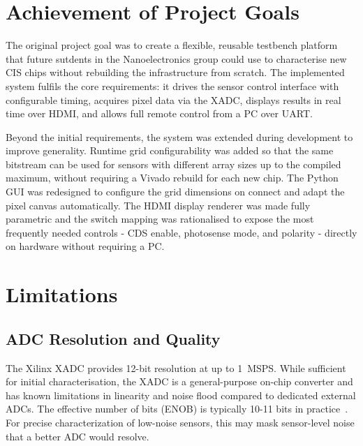 
\section{Achievement of Project Goals}

The original project goal was to create a flexible, reusable testbench platform that future sutdents in the Nanoelectronics group could use to characterise new CIS chips without rebuilding the infrastructure from scratch. The implemented system fulfils the core requirements: it drives the sensor control interface with configurable timing, acquires pixel data via the XADC, displays results in  real time over HDMI, and allows full remote control from a PC over UART.

Beyond the initial requirements, the system was extended during development to improve generality. Runtime grid configurability was added so that the same bitstream can be used for sensors with different array sizes up to the compiled maximum, without requiring a Vivado rebuild for each new chip. The Python GUI was redesigned to configure the grid dimensions on connect and adapt the pixel canvas automatically. The HDMI display renderer was made fully parametric and the switch mapping was rationalised to expose the most frequently needed controls - CDS enable, photosense mode, and polarity - directly on  hardware without requiring a PC.


\section{Limitations}

\subsection{ADC Resolution and Quality}

The Xilinx XADC provides 12-bit resolution at up to 1~MSPS. While sufficient for initial characterisation, the XADC is a general-purpose on-chip converter and has known limitations in linearity and noise flood compared to dedicated external ADCs. The effective number of bits (ENOB) is typically 10-11 bits in practice~\cite{ug480}. For precise characterization of low-noise sensors, this may mask sensor-level noise that a better ADC would resolve.

